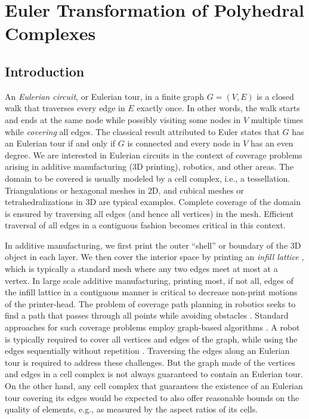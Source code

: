 \chapter{Euler Transformation of Polyhedral Complexes}

\section{Introduction} \label{sec:intro}

An \emph{Eulerian circuit}, or Eulerian tour, in a finite graph $G=(V,E)$ is a closed walk that traverses every edge in $E$ exactly once.
In other words, the walk starts and ends at the same node while possibly visiting some nodes in $V$ multiple times while \emph{covering} all edges.
The classical result attributed to Euler \cite{Eu1736,Hi1873} states that $G$ has an Eulerian tour if and only if $G$ is connected and every node in $V$ has an even degree.
We are interested in Eulerian circuits in the context of coverage problems arising in additive manufacturing (3D printing), robotics, and other areas.
The domain to be covered is usually modeled by a cell complex, i.e., a tessellation.
Triangulations or hexagonal meshes in 2D, and cubical meshes or tetrahedralizations in 3D are typical examples.
Complete coverage of the domain is ensured by traversing all edges (and hence all vertices) in the mesh.
Efficient traversal of all edges in a contiguous fashion becomes critical in this context.

In additive manufacturing, we first print the outer ``shell'' or boundary of the 3D object in each layer.
We then cover the interior space by printing an \emph{infill lattice} \cite{BrBrWiHa2012,WuAaWeSi2018}, which is typically a standard mesh where any two edges meet at most at a vertex.
In large scale additive manufacturing,  printing most, if not all, edges of the infill lattice in a contiguous manner is critical to decrease non-print motions of the printer-head.
The problem of coverage path planning in robotics seeks to find a path that passes through all points while avoiding obstacles \cite{GaCa2013}.
Standard approaches for such coverage problems employ graph-based algorithms \cite{Xu2011}.
A robot is typically required to cover all vertices and edges of the graph, while using the edges sequentially without repetition \cite{CaHuHa1988}.
Traversing the edges along an Eulerian tour is required to address these challenges.
But the graph made of the vertices and edges in a cell complex is not always guaranteed to contain an Eulerian tour.
On the other hand, any cell complex that guarantees the existence of an Eulerian tour covering its edges would be expected to also offer reasonable bounds on the quality of elements, e.g., as measured by the aspect ratios of its cells.

